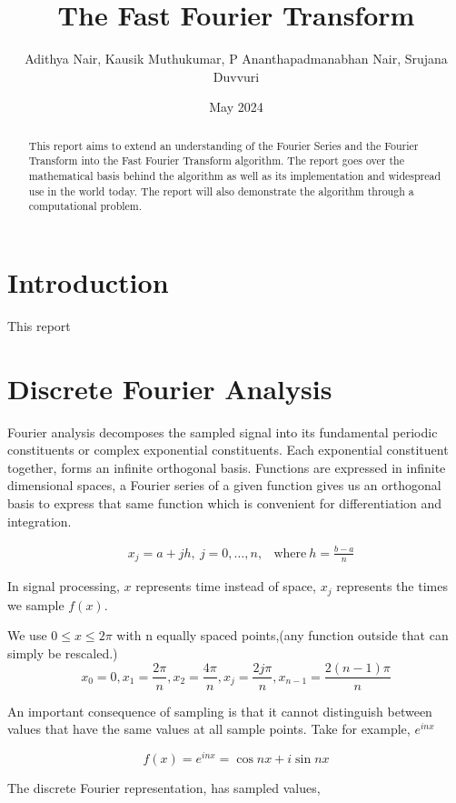 \documentclass[11pt]{amsart}
\title{The Fast Fourier Transform}
\author{Adithya Nair, Kausik Muthukumar, P Ananthapadmanabhan Nair, Srujana Duvvuri}
\date{May 2024}
\theoremstyle{definition}
\theoremstyle{remark}
\numberwithin{equation}{section}
\begin{document}
\begin{abstract}
	This report aims to extend an understanding of the Fourier Series and the Fourier Transform into the Fast Fourier Transform algorithm. The report goes over the mathematical basis behind the algorithm as well as its implementation and widespread use in the world today. The report will also demonstrate the algorithm through a computational problem.
\end{abstract}

\maketitle

\section{Introduction}\label{sec1}
This report  

\section{Discrete Fourier Analysis}
Fourier analysis decomposes the sampled signal into its fundamental periodic constituents or complex exponential constituents. Each exponential constituent together, forms an infinite orthogonal basis. Functions are expressed in infinite dimensional spaces, a Fourier series of a given function gives us an orthogonal basis to express that same function which is convenient for differentiation and integration.

\begin{align*}
	&x_j = a + jh, \ j = 0, \dots, n, & \text{where} \ h = \frac{b-a}{n}
\end{align*}

In signal processing, $x$ represents time instead of space, $x_j$ represents the times we sample $f(x)$.

We use $0 \leq x \leq 2 \pi$ with n equally spaced points,(any function outside that can simply be rescaled.)
\[ 
	x_0 = 0, x_1 = \frac{2\pi}{n}, x_2 = \frac{4\pi}{n}, x_j = \frac{2j\pi}{n}, x_{n-1} = \frac{2(n-1)\pi}{n}
\]

An important consequence of sampling is that it cannot distinguish between values that have the same values at all sample points.
Take for example, $e^{inx}$

\[
	f(x) = e^{inx} = \cos{nx} + i \sin{nx}
\]


The discrete Fourier representation, has sampled values,
\end{document}
